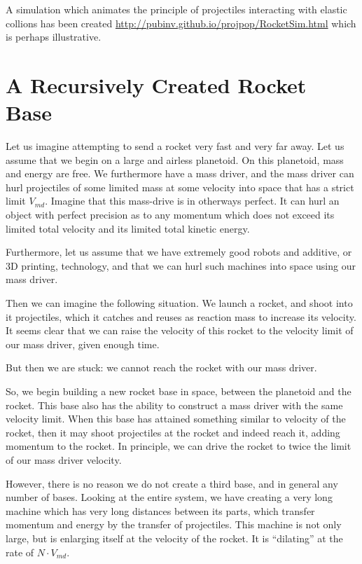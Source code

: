 \documentclass[11pt]{article}
\begin{document}
A simulation which animates the principle of projectiles interacting with elastic collions
has been created
\href{http://pubinv.github.io/projpop/RocketSim.html}{http://pubinv.github.io/projpop/RocketSim.html}
which is perhaps illustrative.

\section{A Recursively Created Rocket Base}

Let us imagine attempting to send a rocket very fast and very far away. Let us assume that we begin on a
large and airless planetoid.  On this planetoid, mass and energy are free.
We furthermore have a mass driver, and the mass driver can hurl projectiles of some limited mass
at some velocity into space that has a strict limit $V_{md}$.  Imagine that this mass-drive is
in otherways perfect.  It can hurl an object with perfect precision as to any momentum which
does not exceed its limited total velocity and its limited total kinetic energy.

Furthermore, let us assume that we have extremely good robots and additive, or 3D printing, technology,
and that we can hurl such machines into space using our mass driver.

Then we can imagine the following situation.  We launch a rocket, and shoot into it projectiles,
which it catches and reuses as reaction mass to increase its velocity.  It seems clear that
we can raise the velocity of this rocket to the velocity limit of our mass driver, given
enough time.

But then we are stuck: we cannot reach the rocket with our mass driver.

So, we begin building a new rocket base in space, between the planetoid and the rocket.
This base also has the ability to construct a mass driver with the same velocity limit.
When this base has attained something similar to velocity of the rocket, then it
may shoot projectiles at the rocket and indeed reach it, adding momentum to the
rocket.  In principle, we can drive the rocket to twice the limit of our mass driver
velocity.

However, there is no reason we do not create a third base, and in general any number of
bases.  Looking at the entire system, we have creating a very long machine which has
very long distances between its parts, which transfer momentum and energy by the
transfer of projectiles.  This machine is not
only large, but is enlarging itself at
the velocity of the rocket.  It is ``dilating'' at the rate of $N \cdot V_{md}$.
\end{document}
